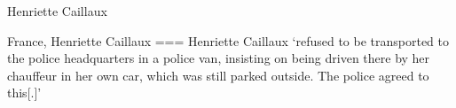 Henriette Caillaux

France, Henriette Caillaux
===
Henriette Caillaux ‘refused to be transported to the police headquarters in a police van, insisting on being driven there by her chauffeur in her own car, which was still parked outside. The police agreed to this[.]’
\nocite{2025c}